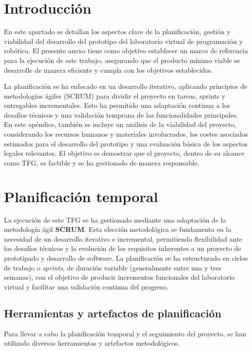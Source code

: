 \section{Introducción}
En este  apartado se detallan los aspectos clave de la planificación, gestión y viabilidad del desarrollo del prototipo del laboratorio virtual de programación y robótica. El presente anexo tiene como objetivo establecer un marco de referencia para la ejecución de este trabajo, asegurando que el producto mínimo viable se desarrolle de manera eficiente y cumpla con los objetivos establecidos.

La planificación se ha enfocado en un desarrollo iterativo, aplicando principios de metodologías ágiles (SCRUM) para dividir el proyecto en tareas, sprints y entregables incrementales. Esto ha permitido una adaptación continua a los desafíos técnicos y una validación temprana de las funcionalidades principales. 
\\

En este apéndice, también se incluye un análisis de la viabilidad del proyecto, considerando los recursos humanos y materiales involucrados, los costes asociados estimados para el desarrollo del prototipo y una evaluación básica de los aspectos legales relevantes. El objetivo es demostrar que el proyecto, dentro de su alcance como TFG, es factible y se ha gestionado de manera responsable.

\section{Planificación temporal}
La ejecución de este TFG se ha gestionado mediante una adaptación de la metodología ágil \textbf{SCRUM}. Esta elección metodológica se fundamenta en la necesidad de un desarrollo iterativo e incremental, permitiendo flexibilidad ante los desafíos técnicos y la evolución de los requisitos inherentes a un proyecto de prototipado y desarrollo de software. La planificación se ha estructurado en ciclos de trabajo o \textit{sprints}, de duración variable (generalmente entre una y tres semanas), con el objetivo de producir incrementos funcionales del laboratorio virtual y facilitar una validación continua del progreso.

 
\subsection{Herramientas y artefactos de planificación}
Para llevar a cabo la planificación temporal y el seguimiento del proyecto, se han utilizado diversas herramientas y artefactos metodológicos.


